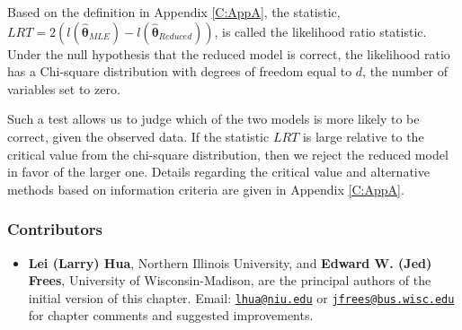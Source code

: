 \documentclass[]{book}
\providecommand{\tightlist}{%
  \setlength{\itemsep}{0pt}\setlength{\parskip}{0pt}}
\theoremstyle{definition}
\theoremstyle{definition}
\theoremstyle{definition}
\theoremstyle{remark}
\begin{document}
Based on the definition in Appendix \ref{C:AppA}, the statistic,
\(LRT= 2 \left( l(\hat{\boldsymbol{\theta}}_{MLE}) - l(\hat{\boldsymbol{\theta}}_{Reduced}) \right)\),
is called the likelihood ratio statistic. Under the null hypothesis that
the reduced model is correct, the likelihood ratio has a Chi-square
distribution with degrees of freedom equal to \(d\), the number of
variables set to zero.

Such a test allows us to judge which of the two models is more likely to
be correct, given the observed data. If the statistic \(LRT\) is large
relative to the critical value from the chi-square distribution, then we
reject the reduced model in favor of the larger one. Details regarding
the critical value and alternative methods based on information criteria
are given in Appendix \ref{C:AppA}.

\subsubsection*{Contributors}\label{contributors-9}

\begin{itemize}
\tightlist
\item
  \textbf{Lei (Larry) Hua}, Northern Illinois University, and
  \textbf{Edward W. (Jed) Frees}, University of Wisconsin-Madison, are
  the principal authors of the initial version of this chapter. Email:
  \href{mailto:lhua@niu.edu}{\nolinkurl{lhua@niu.edu}} or
  \href{mailto:jfrees@bus.wisc.edu}{\nolinkurl{jfrees@bus.wisc.edu}} for
  chapter comments and suggested improvements.
\end{itemize}


\end{document}

